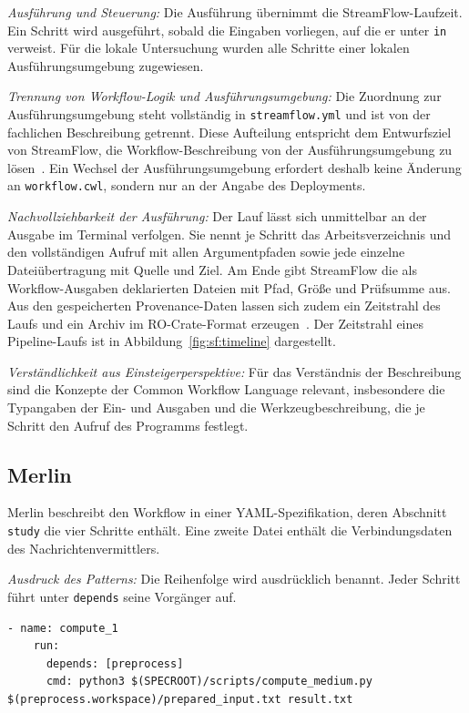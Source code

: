 \emph{Ausführung und Steuerung:} Die Ausführung übernimmt die
StreamFlow-Laufzeit. Ein Schritt wird ausgeführt, sobald die
Eingaben vorliegen, auf die er unter \texttt{in} verweist. Für die
lokale Untersuchung wurden alle Schritte einer lokalen
Ausführungsumgebung zugewiesen.

\emph{Trennung von Workflow-Logik und Ausführungsumgebung:} Die
Zuordnung zur Ausführungsumgebung steht vollständig in
\texttt{streamflow.yml} und ist von der fachlichen Beschreibung
getrennt. Diese Aufteilung entspricht dem Entwurfsziel von
StreamFlow, die Workflow-Beschreibung von der Ausführungsumgebung
zu lösen~\cite[S.~1723]{colonnelli2021streamflow}. Ein Wechsel der
Ausführungsumgebung erfordert deshalb keine Änderung an
\texttt{workflow.cwl}, sondern nur an der Angabe des Deployments.


\emph{Nachvollziehbarkeit der Ausführung:} Der Lauf lässt sich
unmittelbar an der Ausgabe im Terminal verfolgen. Sie nennt je Schritt
das Arbeitsverzeichnis und den vollständigen Aufruf mit allen
Argumentpfaden sowie jede einzelne Dateiübertragung mit Quelle und
Ziel. Am Ende gibt StreamFlow die als Workflow-Ausgaben deklarierten
Dateien mit Pfad, Größe und Prüfsumme aus. Aus den gespeicherten
Provenance-Daten lassen sich zudem ein Zeitstrahl des Laufs und ein
Archiv im RO-Crate-Format erzeugen~\cite{streamflowdocs-inspect}. Der
Zeitstrahl eines Pipeline-Laufs ist in
Abbildung~\ref{fig:sf:timeline} dargestellt.

\emph{Verständlichkeit aus Einsteigerperspektive:} Für das
Verständnis der Beschreibung sind die Konzepte der Common Workflow
Language relevant, insbesondere die Typangaben der Ein- und
Ausgaben und die Werkzeugbeschreibung, die je Schritt den Aufruf
des Programms festlegt.

\subsection{Merlin}
\label{sec:lokal:pipeline:merlin}

Merlin beschreibt den Workflow in einer YAML-Spezifikation, deren
Abschnitt \texttt{study} die vier Schritte enthält. Eine zweite Datei
enthält die Verbindungsdaten des Nachrichtenvermittlers.

\emph{Ausdruck des Patterns:} Die Reihenfolge wird ausdrücklich
benannt. Jeder Schritt führt unter \texttt{depends} seine Vorgänger
auf.

\begin{lstlisting}[caption={Abhängigkeit und Datenweitergabe eines Schritts (Merlin, Pipeline)},label={lst:pipe:me}]
  - name: compute_1
    run:
      depends: [preprocess]
      cmd: python3 $(SPECROOT)/scripts/compute_medium.py $(preprocess.workspace)/prepared_input.txt result.txt
\end{lstlisting}

